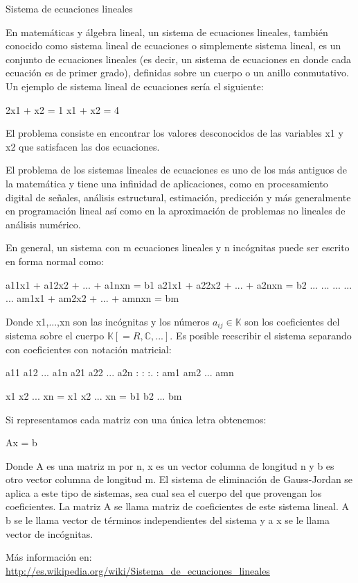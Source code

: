 \documentclass[12pt,letterpaper]{article}
\title{}
\author{Tu nombre}
\begin{document}
Sistema de ecuaciones lineales

En matemáticas y álgebra lineal, un sistema de ecuaciones lineales, también conocido como sistema lineal de ecuaciones o simplemente sistema lineal, es un conjunto de ecuaciones lineales (es decir, un sistema de ecuaciones en donde cada ecuación es de primer grado), definidas sobre un cuerpo o un anillo conmutativo. Un ejemplo de sistema lineal de ecuaciones sería el siguiente:


    2x1 + x2  =  1
    x1 + x2 = 4

El problema consiste en encontrar los valores desconocidos de las variables x1 y x2 que satisfacen las dos ecuaciones.

El problema de los sistemas lineales de ecuaciones es uno de los más antiguos de la matemática y tiene una infinidad de aplicaciones, como en procesamiento digital de señales, análisis estructural, estimación, predicción y más generalmente en programación lineal así como en la aproximación de problemas no lineales de análisis numérico.

En general, un sistema con m ecuaciones lineales y n incógnitas puede ser escrito en forma normal como:


		a11x1 + a12x2  + ...  + a1nxn  = b1
		a21x1 + a22x2  + ...  + a2nxn  = b2
		...      ...     ...     ...    ...
		am1x1 + am2x2  + ...  + amnxn = bm

Donde x1,...,xn son las incógnitas y los números  $ a_{ij} \in \mathbb{K} $  son los coeficientes del sistema sobre el cuerpo $\mathbb{K} [= R, \mathbb{C}, ...]$. Es posible reescribir el sistema separando con coeficientes con notación matricial:

     a11   a12   ...   a1n 
     a21   a22   ...   a2n
     :      :     :.   :
     am1   am2    ... amn
      
     
     x1 x2 ... xn 
     =
     x1 x2 ... xn 
      = 
     b1 b2 ... bm


Si representamos cada matriz con una única letra obtenemos:


Ax = b

Donde A es una matriz m por n, x es un vector columna de longitud n y b es otro vector columna de longitud m. El sistema de eliminación de Gauss-Jordan se aplica a este tipo de sistemas, sea cual sea el cuerpo del que provengan los coeficientes. La matriz A se llama matriz de coeficientes de este sistema lineal. A b se le llama vector de términos independientes del sistema y a x se le llama vector de incógnitas.

Más información en: \url{http://es.wikipedia.org/wiki/Sistema_de_ecuaciones_lineales}
\end{document}
